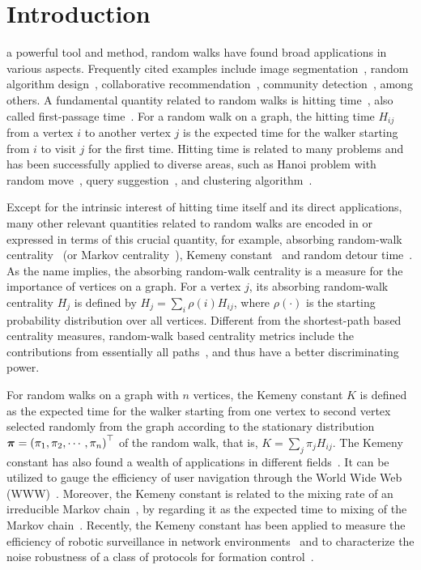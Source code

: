 \documentclass[10pt,twocolumn,twoside]{IEEEtran}
\begin{document}
\section{Introduction}\label{sec:intro}

 a powerful tool and method, random walks have found broad applications in various aspects.
Frequently cited examples include image segmentation~\cite{Le06}, random algorithm design~\cite{SaDi12}, collaborative recommendation~\cite{FoPiReSa07}, community detection~\cite{LaDeBa14}, among others.
A fundamental quantity related to random walks is hitting time~\cite{Lo93}, also called first-passage time~\cite{CoBeTeVoKl07}.
For a random walk on a graph, the hitting time \(H_{ij}\) from a vertex \(i\) to another vertex \(j\) is the expected time for the walker starting from \(i\) to visit \(j\) for the first time.
Hitting time is related to many problems and has been successfully applied to diverse areas, such as Hanoi problem with random move~\cite{WuZhCh11}, query suggestion~\cite{MeZhCh08}, and clustering algorithm~\cite{ChLiTa08}.

Except for the intrinsic interest of hitting time itself and its direct applications, many other relevant quantities related to random walks are encoded in or expressed in terms of this crucial quantity, for example, absorbing random-walk centrality~\cite{MaMaGi15} (or Markov centrality~\cite{WhSm03}), Kemeny constant~\cite{Hu14} and random detour time~\cite{RaZh13}.
As the name implies, the absorbing random-walk centrality is a measure for the importance of vertices on a graph.
For a vertex \(j\), its absorbing random-walk centrality \(H_j\) is defined by \(H_j=\sum_{i} \rho(i) H_{ij}\), where \(\rho(\cdot)\) is the starting probability distribution over all vertices.
Different from the shortest-path based centrality measures, random-walk based centrality metrics include the contributions from essentially all paths~\cite{Ne05}, and thus have a better discriminating power.

For random walks on a graph with \(n\) vertices, the Kemeny constant \(K\) is defined as the expected time for the walker starting from one vertex to second vertex selected randomly from the graph according to the stationary distribution \(\boldsymbol{\pi}=\left(\pi_1, \pi_2, \cdots, \pi_n\right)^{\top}\) of the random walk, that is, \(K=\sum_{j} \pi_j H_{ij}\).
The Kemeny constant has also found a wealth of applications in different fields~\cite{Hu14}.
It can be utilized to gauge the efficiency of user navigation through the World Wide Web (WWW)~\cite{LeLo02}.
Moreover, the Kemeny constant is related to the mixing rate of an irreducible Markov chain~\cite{LePeWi09}, by regarding it as the expected time to mixing of the Markov chain~\cite{Hu06}.
Recently, the Kemeny constant has been applied to measure the efficiency of robotic surveillance in network environments~\cite{PaAgBu15} and to characterize the noise robustness of a class of protocols for formation control~\cite{JaOl19}.
\end{document}
